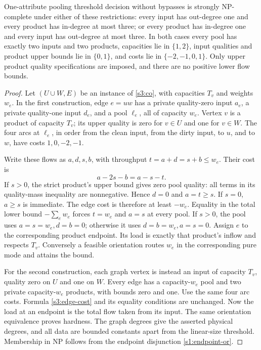 \begin{theorem}\label{s3:local-degrees}
One-attribute pooling threshold decision without bypasses is strongly
NP-complete under either of these restrictions: every input has out-degree
one and every product has in-degree at most three; or every product has
in-degree one and every
input has out-degree at most three. In both cases every pool has exactly
two inputs and two products, capacities lie in $\{1,2\}$, input qualities
and product upper bounds lie in $\{0,1\}$, and costs lie in
$\{-2,-1,0,1\}$. Only upper product quality specifications are imposed,
and there are no positive lower flow bounds.
\end{theorem}
\begin{proof}
Let $(U\cup W,E)$ be an instance of \cref{s3:co}, with capacities $T_v$
and weights $w_e$. In the first construction, edge $e=uw$ has a private
quality-zero input $a_e$, a private quality-one input $d_e$, and a pool
$\ell_e$, all of capacity $w_e$. Vertex $v$ is a product of capacity
$T_v$; its upper quality is zero for $v\in U$ and one for $v\in W$.
The four arcs at $\ell_e$, in order from the clean input, from the dirty
input, to $u$, and to $w$, have costs $1,0,-2,-1$.

Write these flows as $a,d,s,b$, with throughput
$t=a+d=s+b\le w_e$. Their cost is
\begin{equation}
 a-2s-b=a-s-t.\label{s3:edge-cost}
\end{equation}
If $s>0$, the strict product's upper bound gives zero pool quality:
all terms in its quality-mass inequality are nonnegative. Hence $d=0$
and $a=t\ge s$. If $s=0$, $a\ge s$ is immediate. The edge cost is
therefore at least $-w_e$. Equality in the total lower bound
$-\sum_e w_e$ forces $t=w_e$ and $a=s$ at every pool. If $s>0$, the
pool uses $a=s=w_e,d=b=0$; otherwise it uses $d=b=w_e,a=s=0$.
Assign $e$ to the corresponding product endpoint. Its load is exactly
that product's inflow and respects $T_v$. Conversely a feasible orientation
routes $w_e$ in the corresponding pure mode and attains the bound.

For the second construction, each graph vertex is instead an input of
capacity $T_v$, quality zero on $U$ and one on $W$. Every edge has a
capacity-$w_e$ pool and two private capacity-$w_e$ products, with bounds
zero and one. Use the same four arc costs. Formula \eqref{s3:edge-cost}
and its equality conditions are unchanged. Now the load at an endpoint
is the total flow taken from its input. The same orientation equivalence
proves hardness. The graph degrees give the asserted physical degrees,
and all data are bounded constants apart from the linear-size threshold.
Membership in NP follows from the endpoint disjunction
\eqref{s1:endpoint-or}.
\end{proof}

